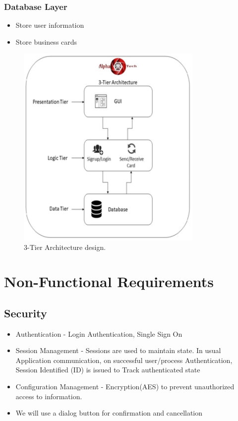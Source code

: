 \documentclass[english]{article}
\begin{document}
	\subsubsection{Database Layer}
		\begin{itemize}
			\item Store user information
			\item Store business cards	
		\end{itemize}
		
		
			\begin{figure}[ht!]
			\centering
			\includegraphics[width=90mm]{ArchitectureStyle.PNG}
			\caption{3-Tier Architecture design.}
		\end{figure}
	
	
	\section{Non-Functional Requirements}
	\subsection{Security}
	\begin{itemize}
		\item Authentication - Login Authentication, Single Sign On
		\item Session Management - Sessions are used to maintain state. In usual Application communication, on successful user/process Authentication, Session Identified (ID) is issued to Track authenticated state
		\item Configuration Management - Encryption(AES) to prevent unauthorized access to information.
		\item  We will use a dialog button for confirmation and cancellation	
	\end{itemize}
\end{document}
